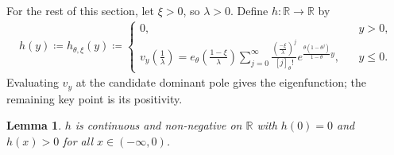 \documentclass[12pt]{article}
\newcommand{\R}{\mathbb{R}} %
\newcommand{\1}{\mathds{1}}
\theoremstyle{definition}
\theoremstyle{plain}
\newtheorem{Lemma}[definition]{Lemma}
\theoremstyle{remark}
\begin{document}
For the rest of this section, let $\xi> 0$, so $\lambda>0$. Define $h:\R\to\R$ by
\begin{align}\label{def_h_thetage1}
    h(y)\coloneqq h_{\theta,\xi}(y)\coloneqq  \begin{cases}
          0,~~~&y>0,
          \\ v_y\left(\frac{1}{\lambda}\right)={e_\theta\left(\frac{1-\xi}{\lambda}\right)}\sum_{j=0}^\infty \frac{\left(\frac{-\xi}{\lambda}\right)^{j}}{[j]_\theta!}e^{\frac{\theta(1-\theta^j)}{1-\theta}y},~~~~&y\le 0.
      \end{cases}
  \end{align}
  Evaluating $v_y$ at the candidate dominant pole gives the eigenfunction; the remaining key point is its positivity.
\begin{Lemma}\label{thetage1_h_pos}
$h$ is continuous and non-negative on $\R$ with $h(0)=0$ and $h(x)>0$ for all $x\in(-\infty,0)$.
\end{Lemma}
\end{document}
